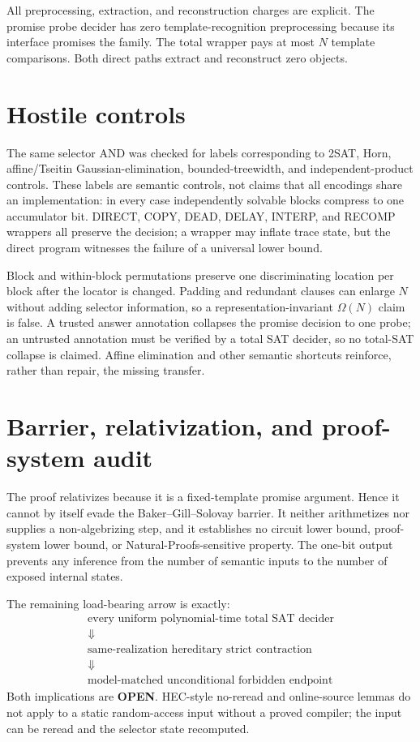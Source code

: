 \documentclass[11pt]{article}
\newcommand{\Status}[1]{\textbf{#1}}
\begin{document}
All preprocessing, extraction, and reconstruction charges are explicit.  The
promise probe decider has zero template-recognition preprocessing because its
interface promises the family.  The total wrapper pays at most $N$ template
comparisons.  Both direct paths extract and reconstruct zero objects.

\section{Hostile controls}

The same selector AND was checked for labels corresponding to 2SAT, Horn,
affine/Tseitin Gaussian-elimination, bounded-treewidth, and independent-product
controls.  These labels are semantic controls, not claims that all encodings
share an implementation: in every case independently solvable blocks compress
to one accumulator bit.  DIRECT, COPY, DEAD, DELAY, INTERP, and RECOMP wrappers
all preserve the decision; a wrapper may inflate trace state, but the direct
program witnesses the failure of a universal lower bound.

Block and within-block permutations preserve one discriminating location per
block after the locator is changed.  Padding and redundant clauses can enlarge
$N$ without adding selector information, so a representation-invariant
$\Omega(N)$ claim is false.  A trusted answer annotation collapses the promise
decision to one probe; an untrusted annotation must be verified by a total SAT
decider, so no total-SAT collapse is claimed.  Affine elimination and other
semantic shortcuts reinforce, rather than repair, the missing transfer.

\section{Barrier, relativization, and proof-system audit}

The proof relativizes because it is a fixed-template promise argument.  Hence
it cannot by itself evade the Baker--Gill--Solovay barrier.  It neither
arithmetizes nor supplies a non-algebrizing step, and it establishes no circuit
lower bound, proof-system lower bound, or Natural-Proofs-sensitive property.
The one-bit output prevents any inference from the number of semantic inputs
to the number of exposed internal states.

The remaining load-bearing arrow is exactly:
\[
 \begin{array}{c}
 \boxed{\text{every uniform polynomial-time total SAT decider}}\\[3pt]
 \Downarrow\\[3pt]
 \boxed{\text{same-realization hereditary strict contraction}}\\[3pt]
 \Downarrow\\[3pt]
 \boxed{\text{model-matched unconditional forbidden endpoint}}
 \end{array}
\]
Both implications are \Status{OPEN}.  HEC-style no-reread and online-source
lemmas do not apply to a static random-access input without a proved compiler;
the input can be reread and the selector state recomputed.
\end{document}
